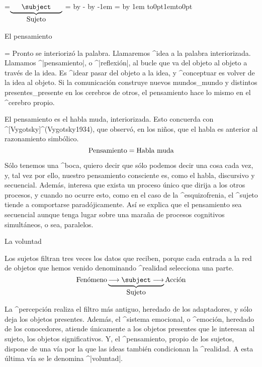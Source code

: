 =\hbox{$\underbrace{\phantom{\longrightarrow}%
   \subject
   \phantom{\longrightarrow}}_{\hbox{Sujeto}}$}
=\hsize \advance{} by - \advance{} by -1em
= \advance{} by 1em
\nointerlineskip
\hbox to0pt{\kern{}\kern1em\vbox to0pt{\kern2pc\vss}\hss}
\nointerlineskip

\Section El pensamiento

\begingroup\rightskip=
Pronto se interiorizó la palabra. Llamaremos ^{idea} a la palabra
interiorizada. Llamamos ^|pensamiento|, o ^|reflexión|, al bucle que va
del objeto al objeto a través de la idea. Es ^{idear} pasar del objeto a
la idea, y ^{conceptuar} es volver de la idea al objeto. Si la
comunicación construye nuevos mundos_{mundo} y distintos
presentes_{presente} en los cerebros de otros, el pensamiento hace lo
mismo en el ^{cerebro} propio.
\par\endgroup


El pensamiento es el habla muda, interiorizada. Esto concuerda con
^[Vygotsky]^(Vygotsky1934), que observó, en los niños, que el habla es
anterior al razonamiento simbólico.
$$\hbox{Pensamiento} = \hbox{Habla muda}$$

Sólo tenemos una ^{boca}, quiero decir que sólo podemos decir una cosa
cada vez, y, tal vez por ello, nuestro pensamiento consciente es, como
el habla, discursivo y secuencial. Además, interesa que exista un
proceso único que dirija a los otros procesos, y cuando no ocurre esto,
como en el caso de la ^{esquizofrenia}, el ^{sujeto} tiende a
comportarse paradójicamente. Así se explica que el pensamiento sea
secuencial aunque tenga lugar sobre una maraña de procesos cognitivos
simultáneos, o sea, paralelos.


\Section La voluntad

Los sujetos filtran tres veces los datos que reciben, porque cada
entrada a la red de objetos que hemos venido denominando ^{realidad}
selecciona una parte.
$$\hbox{Fenómeno}
  \underbrace{\longrightarrow\subject
   \longrightarrow}_{\hbox{Sujeto}}
  \hbox{Acción}
\abovedisplayskip=\abovedisplayshortskip
\belowdisplayskip=\belowdisplayshortskip
$$

La ^{percepción} realiza el filtro más antiguo, heredado de los
adaptadores, y sólo deja los objetos presentes. Además, el ^{sistema
emocional}, o ^{emoción}, heredado de los conocedores, atiende
únicamente a los objetos presentes que le interesan al sujeto, los
objetos significativos. Y, el ^{pensamiento}, propio de los sujetos,
dispone de una vía por la que las ideas también condicionan la
^{realidad}. A esta última vía se le denomina ^|voluntad|.

